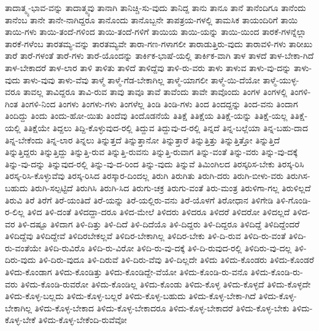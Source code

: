 {ತಾದಾತ್ಮ್ಯ-ಭಾವ-ವನ್ನು
ತಾದಾತ್ಮ್ಯವು
ತಾನಾಗಿ
ತಾನಿಚ್ಚಿ-ಸು-ವುದು
ತಾನಿದ್ದ
ತಾನು
ತಾನೂ
ತಾನೆ
ತಾನೆಂದಿಗೂ
ತಾನೆಂದು
ತಾನೆಂಬ
ತಾನೇ
ತಾನೇ-ನಾಗಿದ್ದರೂ
ತಾನೊಂದು
ತಾನೊಬ್ಬನೇ
ತಾಪತ್ರಯ-ಗಳಲ್ಲಿ
ತಾಮಸಿಕ
ತಾಯಂದಿರಿಗೆ
ತಾಯಿ
ತಾಯಿ-ಗಳು
ತಾಯಿ-ತಂದೆ-ಗಳಿಂದ
ತಾಯಿ-ತಂದೆ-ಗಳಿಗೆ
ತಾಯಿಯ
ತಾಯಿ-ಯನ್ನು
ತಾಯಿ-ಯಿಂದ
ತಾರಕೆ-ಗಳನ್ನೆಲ್ಲಾ
ತಾರಕೆ-ಗಳೆಂಬ
ತಾರತಮ್ಯ-ವನ್ನು
ತಾರತಮ್ಯವೇ
ತಾರಾ-ಗಣ-ಗಳಾಗಲೀ
ತಾರಾಡುತ್ತಿರು-ವುದು
ತಾರಾವಳಿ-ಗಳು
ತಾರೀಖು
ತಾರೆ
ತಾರೆ-ಗಳಂತೆ
ತಾರೆ-ಗಳು
ತಾರೆ-ಯೊಂದನ್ನು
ತಾರ್ಕಿಕ-ಭಾಷೆ-ಯಲ್ಲಿ
ತಾರ್ಕಿಕ-ವಾಗಿ
ತಾಳ
ತಾಳದೆ
ತಾಳ-ಬೇಕಾ-ಗಿದೆ
ತಾಳ-ಬೇಕಾದರೆ
ತಾಳ-ಲಾರ
ತಾಳಿ
ತಾಳಿತು
ತಾಳಿದೆ
ತಾಳಿದ್ದೆವು
ತಾಳಿ-ರು-ವರು
ತಾಳು
ತಾಳುವ
ತಾಳು-ವು-ದನ್ನು
ತಾಳು-ವುದು
ತಾಳು-ವುವು
ತಾಳು-ವೆವು
ತಾಳ್ಮೆ
ತಾಳ್ಮೆ-ಗೆಡ-ಬೇಕಾಗಿಲ್ಲ
ತಾಳ್ಮೆ-ಯಾಗಲೀ
ತಾಳ್ಮೆ-ಯಿ-ದೆಯೋ
ತಾಳ್ಮೆ-ಯುಳ್ಳ-ವರೂ
ತಾವಲ್ಲ
ತಾವಿದ್ದರೂ
ತಾವಿ-ರುವ
ತಾವು
ತಾವೂ
ತಾವೆ
ತಾವೆಂದು
ತಾವೇ
ತಾವೊಂದು
ತಿಂಗಳ
ತಿಂಗಳಲ್ಲಿ
ತಿಂಗಳಿ-ಗಿಂತ
ತಿಂಗಳಿ-ನಿಂದ
ತಿಂಗಳು
ತಿಂಗಳು-ಗಳು
ತಿಂಗಳೆಲ್ಲ
ತಿಂಡಿ
ತಿಂಡಿ-ಗಳು
ತಿಂದ
ತಿಂದದ್ದನ್ನು
ತಿಂದ-ವನು
ತಿಂದಾಗ
ತಿಂದಿದ್ದು
ತಿಂದು
ತಿಂದು-ಹೋ-ಯಿತು
ತಿಂದೆವು
ತಿಂದೊಡನೆಯೆ
ತಿತಿಕ್ಷೆ
ತಿತಿಕ್ಷೆಯ
ತಿತಿಕ್ಷೆ-ಯನ್ನು
ತಿತಿಕ್ಷೆ-ಯಲ್ಲ
ತಿತಿಕ್ಷೆ-ಯಲ್ಲಿ
ತಿತಿಕ್ಷೆಯೇ
ತಿದ್ದಲು
ತಿದ್ದಿ-ಕೊಳ್ಳುವುದ-ರಲ್ಲಿ
ತಿದ್ದುವ
ತಿದ್ದುವು-ದ-ರಲ್ಲಿ
ತಿನ್ನದೆ
ತಿನ್ನ-ಬಲ್ಲೆಯಾ
ತಿನ್ನ-ಬಹು-ದಾದ
ತಿನ್ನ-ಬೇಕೆಂದು
ತಿನ್ನ-ಲಾರ
ತಿನ್ನಲು
ತಿನ್ನುತ್ತದೆ
ತಿನ್ನುತ್ತಾನೋ
ತಿನ್ನುತ್ತಾರೆ
ತಿನ್ನುತ್ತಿತ್ತು
ತಿನ್ನುತ್ತಿತ್ತೋ
ತಿನ್ನುತ್ತಿದೆ
ತಿನ್ನುತ್ತಿದ್ದರು
ತಿನ್ನುತ್ತಿದ್ದು
ತಿನ್ನುತ್ತಿ-ರುವ
ತಿನ್ನುತ್ತಿ-ರುವನು
ತಿನ್ನುತ್ತಿ-ರುವಾಗ
ತಿನ್ನು-ವಂತೆ
ತಿನ್ನು-ವರು
ತಿನ್ನು-ವು-ದಕ್ಕೆ
ತಿನ್ನು-ವು-ದನ್ನು
ತಿನ್ನುವುದ-ರಲ್ಲಿ
ತಿನ್ನು-ವು-ದ-ರಿಂದ
ತಿನ್ನು-ವುದು
ತಿನ್ನುವೆ
ತಿಮಿಂಗಿಲದ
ತಿರಸ್ಕರಿಸ-ಬೇಕು
ತಿರಸ್ಕ-ರಿಸಿ
ತಿರಸ್ಕ-ರಿಸಿ-ಕೊಳ್ಳುವೆವು
ತಿರಸ್ಕ-ರಿಸಿದ
ತಿರಸ್ಕಾರ-ದಿಂದಲ್ಲ
ತಿರುಗಿ
ತಿರುಗಿತು
ತಿರುಗಿ-ದರು
ತಿರುಗಿ-ಬೀಳು-ವರು
ತಿರುಗಿಸ-ಬಹುದು
ತಿರುಗಿ-ಸಲ್ಪಟ್ಟಿದೆ
ತಿರುಗಿಸಿ
ತಿರುಗಿ-ಸಿದ
ತಿರುಗು-ಚಕ್ರ
ತಿರುಗು-ವಂತೆ
ತಿರು-ಮಂತ್ರ
ತಿರುಳಿಗಾ-ಗಲ್ಲ
ತಿರುಳಿಲ್ಲದೆ
ತಿರುವಿ
ತಿರೆ
ತಿರೆಗೆ
ತಿರೆ-ಯಂತಿದೆ
ತಿರೆ-ಯನ್ನು
ತಿರೆ-ಯಲ್ಲಿರು-ವನು
ತಿರೆ-ಯೊಳಗೆ
ತಿರೋಧಾನ
ತಿಳಿಗೇಡಿ
ತಿಳಿ-ಗೊಂಡಿ-ರ-ಲಿಲ್ಲ
ತಿಳಿದ
ತಿಳಿ-ದಂತೆ
ತಿಳಿದದ್ದಾ-ದರೂ
ತಿಳಿದ-ಮೇಲೆ
ತಿಳಿದರು
ತಿಳಿದರೂ
ತಿಳಿದರೆ
ತಿಳಿದರೋ
ತಿಳಿದಲ್ಲದೆ
ತಿಳಿದ-ವರ
ತಿಳಿ-ದಷ್ಟೂ
ತಿಳಿದಾಗ
ತಿಳಿ-ದಿತ್ತು
ತಿಳಿ-ದಿದೆ
ತಿಳಿ-ದಿದೆಯೊ
ತಿಳಿ-ದಿದ್ದರು
ತಿಳಿ-ದಿದ್ದರೂ
ತಿಳಿದಿದ್ದೆ
ತಿಳಿದಿದ್ದೆಂದರೆ
ತಿಳಿದಿದ್ದೆವು
ತಿಳಿದಿದ್ದೇವೆ
ತಿಳಿದಿರಬೇಕಲ್ಲವೆ
ತಿಳಿದಿರ-ಬೇಕಾಗಿಲ್ಲ
ತಿಳಿದಿರ-ಬೇಕು
ತಿಳಿ-ದಿ-ರುವ
ತಿಳಿದಿ-ರು-ವಂತೆ
ತಿಳಿದಿ-ರು-ವಂತೆಯೇ
ತಿಳಿದಿ-ರುವಿರೊ
ತಿಳಿದಿ-ರು-ವಿರೋ
ತಿಳಿದಿ-ರು-ವು-ದಕ್ಕೆ
ತಿಳಿ-ದಿ-ರುವುದ-ರಲ್ಲಿ
ತಿಳಿದಿರು-ವು-ದಲ್ಲ
ತಿಳಿ-ದಿರು-ವುದು
ತಿಳಿ-ದಿರು-ವುದೂ
ತಿಳಿ-ದಿರುವೆ
ತಿಳಿ-ದಿರು-ವೆವು
ತಿಳಿ-ದಿಲ್ಲದೇ
ತಿಳಿದು
ತಿಳಿದು-ಕೊಂಡರು
ತಿಳಿದು-ಕೊಂಡರೆ
ತಿಳಿದು-ಕೊಂಡಾಗ
ತಿಳಿದು-ಕೊಂಡಿತ್ತು
ತಿಳಿದು-ಕೊಂಡಿದ್ದೇ-ವೆಯೋ
ತಿಳಿದು-ಕೊಂಡಿ-ರು-ವನೊ
ತಿಳಿದು-ಕೊಂಡಿ-ರು-ವರು
ತಿಳಿದು-ಕೊಂಡಿ-ರುವರೋ
ತಿಳಿದು-ಕೊಂಡಿಲ್ಲ
ತಿಳಿದು-ಕೊಂಡು
ತಿಳಿದು-ಕೊಳ್ಳ
ತಿಳಿದು-ಕೊಳ್ಳದೆ
ತಿಳಿದು-ಕೊಳ್ಳದೇ
ತಿಳಿದು-ಕೊಳ್ಳ-ಬಲ್ಲದು
ತಿಳಿದು-ಕೊಳ್ಳ-ಬಲ್ಲರೆ
ತಿಳಿದು-ಕೊಳ್ಳ-ಬಹುದು
ತಿಳಿದು-ಕೊಳ್ಳ-ಬೇಕಾ-ಗಿದೆ
ತಿಳಿದು-ಕೊಳ್ಳ-ಬೇಕಾಗಿಲ್ಲ
ತಿಳಿದು-ಕೊಳ್ಳ-ಬೇಕಾದ
ತಿಳಿದು-ಕೊಳ್ಳ-ಬೇಕಾದರೂ
ತಿಳಿದು-ಕೊಳ್ಳ-ಬೇಕಾದರೆ
ತಿಳಿದು-ಕೊಳ್ಳ-ಬೇಕು
ತಿಳಿದು-ಕೊಳ್ಳ-ಬೇಕೆ
ತಿಳಿದು-ಕೊಳ್ಳ-ಬೇಕೆಂದಿ-ರುವೆವೋ
}
